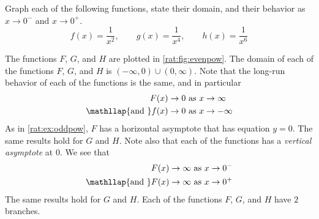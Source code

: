 \begin{pccexample}\label{rat:ex:evenpow}%
Graph each of the following functions, state their domain, and their 
behavior as $x\rightarrow 0^-$ and $x\rightarrow 0^+$.
\[
  f(x)=\frac{1}{x^2},\qquad g(x)=\frac{1}{x^4},\qquad h(x)=\frac{1}{x^6}
\]
\begin{pccsolution}
 The functions $F$, $G$, and $H$ are plotted in \cref{rat:fig:evenpow}.
The domain of each of the functions $F$, $G$, and $H$ is $(-\infty,0)\cup (0,\infty)$. Note that 
the long-run behavior of each of the functions is the same, and in particular
\begin{align*}
    F(x)\rightarrow 0                           & \text{ as } x\rightarrow\infty\\
    \mathllap{\text{and }}    f(x)\rightarrow 0 &\text{ as } x\rightarrow-\infty
\end{align*}
As in \cref{rat:ex:oddpow}, $F$ has a horizontal asymptote  that 
has equation $y=0$.
The same results hold for $G$ and $H$. Note also that each of the functions
has a \emph{vertical asymptote} at $0$. We see that
\begin{align*}
    F(x)\rightarrow \infty     & \text{ as } x\rightarrow 0^-\\
    \mathllap{\text{and }}   F(x)\rightarrow \infty &\text{ as } x\rightarrow 0^+
\end{align*}
The same results hold for $G$ and $H$. Each of the functions $F$, $G$, and $H$ 
have $2$ branches.
\end{pccsolution}
\end{pccexample}
